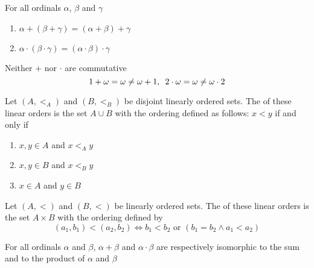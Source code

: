 \documentclass[11pt]{article}
\begin{document}
\begin{lemma}[]
For all ordinals \(\alpha\), \(\beta\) and \(\gamma\)
\begin{enumerate}
\item \(\alpha+(\beta+\gamma)=(\alpha+\beta)+\gamma\)
\item \(\alpha\cdot(\beta\cdot\gamma)=(\alpha\cdot\beta)\cdot\gamma\)
\end{enumerate}
\end{lemma}
Neither \(+\) nor \(\cdot\) are commutative
\begin{equation*}
1+\omega=\omega\neq \omega+1,\enspace 2\cdot\omega=\omega\neq\omega\cdot 2
\end{equation*}

\begin{definition}[]
Let \((A,<_A)\) and \((B,<_B)\) be disjoint linearly ordered sets. The 
of these linear orders is the set \(A\cup B\) with the ordering defined as
follows:
\(x<y\) if and only if
\begin{enumerate}
\item \(x,y\in A\) and \(x<_A y\)
\item \(x,y\in B\) and \(x<_B y\)
\item \(x\in A\) and \(y\in B\)
\end{enumerate}
\end{definition}

\begin{definition}[]
Let \((A,<)\) and \((B,<)\) be linearly ordered sets. The  of these
linear orders is the set \(A\times B\) with the ordering defined by
\begin{equation*}
(a_1,b_1)<(a_2,b_2)\Leftrightarrow b_1<b_2\text{ or } (b_1=b_2\wedge a_1<a_2)
\end{equation*}
\end{definition}
\begin{lemma}[]
For all ordinals \(\alpha\) and \(\beta\), \(\alpha+\beta\) and \(\alpha\cdot\beta\) are
respectively isomorphic to the sum and to the product of \(\alpha\) and \(\beta\)
\end{lemma}
\end{document}
